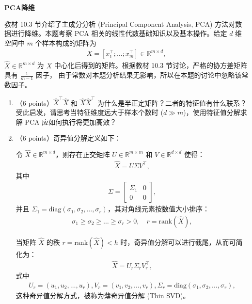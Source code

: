 \documentclass[answers]{exam}  %
\begin{document}
\begin{questions}
\question [30] \textbf{PCA降维}


教材 10.3 节介绍了主成分分析 (Principal Component Analysis, PCA) 方法对数据进行降维。本题考察 PCA 相关的线性代数基础知识以及基本操作。给定 $d$ 维空间中 $m$ 个样本构成的矩阵为
\begin{align}
X = [x_1^\top; \dots; x_m^\top] \in \mathbb{R}^{m \times d},
\end{align}
$\hat{X} \in \mathbb{R}^{m \times d}$ 为 $X$ 中心化后得到的矩阵。根据教材 10.3 节讨论，严格的协方差矩阵具有 $\frac{1}{m-1}$ 因子， 由于常数对本题分析结果无影响，所以在本题的讨论中忽略该常数因子。
\begin{enumerate}
    \item （6 points）$\hat{X}^\top \hat{X}$ 和 $\hat{X} \hat{X}^\top$ 为什么是半正定矩阵？二者的特征值有什么联系？受此启发，请思考当特征维度远大于样本个数时 ($d \gg m$)，使用特征值分解求解 PCA 应如何执行将更加高效？
    \item （6 points）奇异值分解定义如下：
    
    \vspace{\baselineskip}令 $\hat{X} \in \mathbb{R}^{m \times d}$，则存在正交矩阵 $U \in \mathbb{R}^{m \times m}$ 和 $V \in \mathbb{R}^{d \times d}$ 使得：
    \begin{align}
        \hat{X} = U \Sigma V^\top,
    \end{align}
    其中
    \begin{align}
    \Sigma = \begin{bmatrix}
    \Sigma_1 & 0 \\
    0 & 0
    \end{bmatrix},
    \end{align}
    并且 $\Sigma_1 = \text{diag}(\sigma_1, \sigma_2, \dots, \sigma_r)$，其对角线元素按数值大小排序：
    \begin{align}
        \sigma_1 \geq \sigma_2 \geq \dots \geq \sigma_r > 0, \quad r = \text{rank}(\hat{X}),
    \end{align}

    当矩阵 $\hat{X}$ 的秩 $r = \text{rank}(\hat{X}) < h$ 时，奇异值分解可以进行截尾，从而可简化为：
    \begin{align}
        \hat{X} = U_r \Sigma_r V_r^\top,
    \end{align}
    式中
    \begin{align}
        U_r = (u_1, u_2, \dots, u_r), V_r = (v_1, v_2, \dots, v_r), \Sigma_r = \text{diag}(\sigma_1, \sigma_2, \dots, \sigma_r),
    \end{align}
    这种奇异值分解方式，被称为薄奇异值分解 (Thin SVD)。
    

\end{enumerate}
\end{questions}
\end{document}
